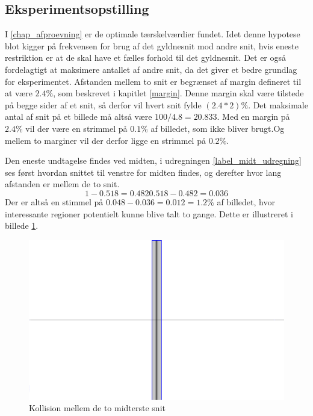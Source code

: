 {\subsection{Eksperimentsopstilling}
I \ref{chap_afproevning} er de optimale tærskelværdier fundet.  Idet
denne hypotese blot kigger på frekvensen for brug af det gyldnesnit mod
andre snit, hvis eneste restriktion er at de skal have et fælles forhold
til det gyldnesnit.  Det er også fordelagtigt at maksimere antallet af
andre snit, da det giver et bedre grundlag for eksperimentet.  Afstanden
mellem to snit er begrænset af margin defineret til at være
$2.4\%$, som beskrevet i kapitlet \ref{margin}.  Denne margin skal være tilstede på begge sider af
et snit, så derfor vil hvert snit fylde $(2.4*2)\%$.  Det maksimale
antal af snit på et billede må altså være $100/4.8=20.833$.
Med en margin på $2.4\%$ vil der være en strimmel på $0.1\%$ af
billedet, som ikke bliver brugt.Og mellem to marginer vil der derfor ligge en
strimmel på $0.2\%$. 

Den eneste undtagelse findes ved midten, i udregningen
\ref{label_midt_udregning} ses først hvordan snittet til venstre for
midten findes, og derefter hvor lang afstanden er mellem de to snit.
\begin{equation}\label{resul_midt_udregningen}
    1-0.518 = 0.482
    0.518-0.482 = 0.036
\end{equation}
Der er altså en stimmel på $0.048-0.036 = 0.012 = 1.2\%$ af
billedet, hvor interessante regioner potentielt kunne blive talt to gange.
Dette er illustreret i billede \ref{resultat_fejl_midt}.
\begin{figure}[!h]
	\centering
	\includegraphics[scale=0.5]{afsnit/resultater/billeder/midt_strimmel}
	\caption{Kollision mellem de to midterste snit}
	\label{resultat_fejl_midt}
\end{figure}

}
